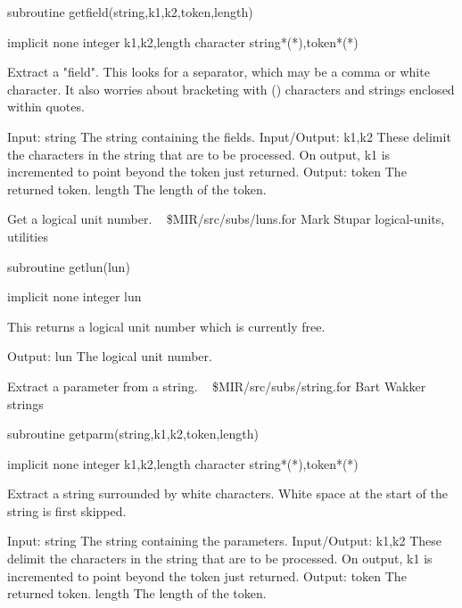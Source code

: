 \par{\tenpoint
{\eightpoint\begintt
        subroutine getfield(string,k1,k2,token,length)

        implicit none
        integer k1,k2,length
        character string*(*),token*(*)

  Extract a "field". This looks for a separator, which may be a comma
  or white character. It also worries about bracketing with () characters
  and strings enclosed within quotes.

  Input:
    string     The string containing the fields.
  Input/Output:
    k1,k2      These delimit the characters in the string that are
               to be processed. On output, k1 is incremented to point
               beyond the token just returned.
  Output:
    token      The returned token.
    length     The length of the token.
\endtt}
\par}
%
\noindent Get a logical unit number.
\newline \ 
\newline {} \$MIR/src/subs/luns.for
\newline {} Mark Stupar
\newline {} logical-units, utilities
\par{\tenpoint
{\eightpoint\begintt
        subroutine getlun(lun)

        implicit none
        integer lun

  This returns a logical unit number which is currently free.

  Output:
    lun        The logical unit number.
\endtt}
\par}
%
\noindent Extract a parameter from a string.
\newline \ 
\newline {} \$MIR/src/subs/string.for
\newline {} Bart Wakker
\newline \abox{Keywords:} strings
\par{\tenpoint
{\eightpoint\begintt
        subroutine getparm(string,k1,k2,token,length)

        implicit none
        integer k1,k2,length
        character string*(*),token*(*)

  Extract a string surrounded by white characters. White space at the
  start of the string is first skipped.

  Input:
    string     The string containing the parameters.
  Input/Output:
    k1,k2      These delimit the characters in the string that are
               to be processed. On output, k1 is incremented to point
               beyond the token just returned.
  Output:
    token      The returned token.
    length     The length of the token.
\endtt}
\par}
